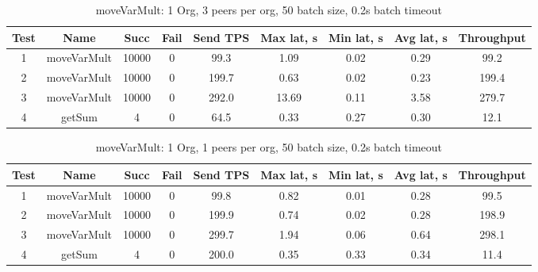 \begin{appendices}
\begin{table}[h!]
\begin{center}
\begin{tabular}{ |c|c|c|c|c|c|c|c|c| }
 \hline
  Test & Name & Succ  & Fail & Send TPS & Max lat, s & Min lat, s & Avg lat, s & Throughput \\
 \hline
 \hline
 1    & moveVarMult & 10000 & 0    & 99.3  & 1.09      & 0.02      & 0.29      & 99.2   \\
 \hline
 2    & moveVarMult & 10000 & 0    & 199.7 & 0.63      & 0.02      & 0.23      & 199.4  \\
 \hline
 3    & moveVarMult & 10000 & 0    & 292.0 & 13.69     & 0.11      & 3.58      & 279.7  \\
 \hline
 4    & getSum      & 4     & 0    & 64.5  & 0.33      & 0.27      & 0.30      & 12.1   \\
 \hline
\end{tabular}
\end{center}
\caption{moveVarMult: 1 Org, 3 peers per org, 50 batch size, 0.2s batch timeout}
\end{table}

\begin{table}[h!]
\begin{center}
\begin{tabular}{ |c|c|c|c|c|c|c|c|c| }
 \hline
  Test & Name & Succ  & Fail & Send TPS & Max lat, s & Min lat, s & Avg lat, s & Throughput \\
 \hline
 \hline
 1    & moveVarMult & 10000 & 0    & 99.8  & 0.82      & 0.01      & 0.28      & 99.5   \\
 \hline
 2    & moveVarMult & 10000 & 0    & 199.9 & 0.74      & 0.02      & 0.28      & 198.9  \\
 \hline
 3    & moveVarMult & 10000 & 0    & 299.7 & 1.94      & 0.06      & 0.64      & 298.1  \\
 \hline
 4    & getSum      & 4     & 0    & 200.0 & 0.35      & 0.33      & 0.34      & 11.4   \\
 \hline
\end{tabular}
\end{center}
\caption{moveVarMult: 1 Org, 1 peers per org, 50 batch size, 0.2s batch timeout}
\end{table}

\end{appendices}
